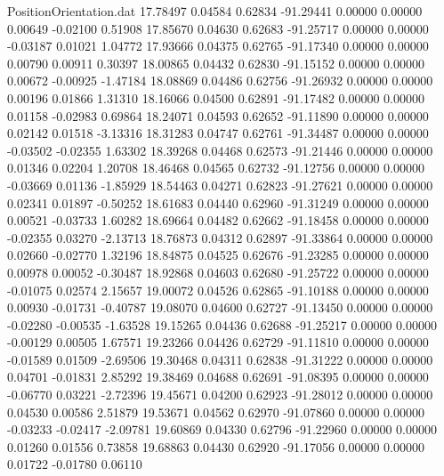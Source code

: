 \begin{filecontents}{PositionOrientation.dat}
  17.78497    0.04584    0.62834   -91.29441    0.00000    0.00000    0.00649   -0.02100    0.51908
  17.85670    0.04630    0.62683   -91.25717    0.00000    0.00000   -0.03187    0.01021    1.04772
  17.93666    0.04375    0.62765   -91.17340    0.00000    0.00000    0.00790    0.00911    0.30397
  18.00865    0.04432    0.62830   -91.15152    0.00000    0.00000    0.00672   -0.00925   -1.47184
  18.08869    0.04486    0.62756   -91.26932    0.00000    0.00000    0.00196    0.01866    1.31310
  18.16066    0.04500    0.62891   -91.17482    0.00000    0.00000    0.01158   -0.02983    0.69864
  18.24071    0.04593    0.62652   -91.11890    0.00000    0.00000    0.02142    0.01518   -3.13316
  18.31283    0.04747    0.62761   -91.34487    0.00000    0.00000   -0.03502   -0.02355    1.63302
  18.39268    0.04468    0.62573   -91.21446    0.00000    0.00000    0.01346    0.02204    1.20708
  18.46468    0.04565    0.62732   -91.12756    0.00000    0.00000   -0.03669    0.01136   -1.85929
  18.54463    0.04271    0.62823   -91.27621    0.00000    0.00000    0.02341    0.01897   -0.50252
  18.61683    0.04440    0.62960   -91.31249    0.00000    0.00000    0.00521   -0.03733    1.60282
  18.69664    0.04482    0.62662   -91.18458    0.00000    0.00000   -0.02355    0.03270   -2.13713
  18.76873    0.04312    0.62897   -91.33864    0.00000    0.00000    0.02660   -0.02770    1.32196
  18.84875    0.04525    0.62676   -91.23285    0.00000    0.00000    0.00978    0.00052   -0.30487
  18.92868    0.04603    0.62680   -91.25722    0.00000    0.00000   -0.01075    0.02574    2.15657
  19.00072    0.04526    0.62865   -91.10188    0.00000    0.00000    0.00930   -0.01731   -0.40787
  19.08070    0.04600    0.62727   -91.13450    0.00000    0.00000   -0.02280   -0.00535   -1.63528
  19.15265    0.04436    0.62688   -91.25217    0.00000    0.00000   -0.00129    0.00505    1.67571
  19.23266    0.04426    0.62729   -91.11810    0.00000    0.00000   -0.01589    0.01509   -2.69506
  19.30468    0.04311    0.62838   -91.31222    0.00000    0.00000    0.04701   -0.01831    2.85292
  19.38469    0.04688    0.62691   -91.08395    0.00000    0.00000   -0.06770    0.03221   -2.72396
  19.45671    0.04200    0.62923   -91.28012    0.00000    0.00000    0.04530    0.00586    2.51879
  19.53671    0.04562    0.62970   -91.07860    0.00000    0.00000   -0.03233   -0.02417   -2.09781
  19.60869    0.04330    0.62796   -91.22960    0.00000    0.00000    0.01260    0.01556    0.73858
  19.68863    0.04430    0.62920   -91.17056    0.00000    0.00000    0.01722   -0.01780    0.06110

\end{filecontents}
